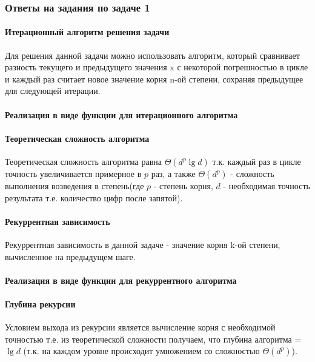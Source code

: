 \documentclass[a4paper, 14pt]{extarticle}
\begin{document}
\subsubsection{Ответы на задания по задаче 1}
\paragraph{Итерационный алгоритм решения задачи}
Для решения данной задачи можно использовать алгоритм, который сравнивает разность
текущего и предыдущего значения x с некоторой погрешностью в цикле и каждый
раз считает новое значение корня n-ой степени, сохраняя предыдущее для следующей
итерации.
\paragraph{Реализация в виде функции для итерационного алгоритма}

\paragraph{Теоретическая сложность алгоритма}
Теоретическая сложность алгоритма равна $\Theta(d^p\lg d)$ т.к.
каждый раз в цикле точность увеличивается примерное в $p$ раз, а также
$\Theta(d^p)$ - сложность выполнения возведения в степень(где $p$ - степень корня,
$d$ - необходимая точность результата т.е. количество цифр после запятой).
\paragraph{Рекуррентная зависимость}
Рекуррентная зависимость в данной задаче - значение корня k-ой степени,
вычисленное на предыдущем шаге.
\paragraph{Реализация в виде функции для рекуррентного алгоритма}

\paragraph{Глубина рекурсии}
Условием выхода из рекурсии является вычисление корня с необходимой точностью т.е.
из теоретической сложности получаем, что глубина алгоритма = $\lg d$ (т.к.
на каждом уровне происходит умножением со сложностью $\Theta(d^p)$).
\end{document}
